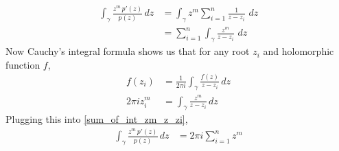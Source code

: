 \documentclass{homework}
\begin{document}
                                                                                      \begin{solution}
                                                                                      \begin{align}
                                                                                      \int_\gamma \frac{z^m \, p'(z)}{p(z)} \, dz &= \int_\gamma z^m\sum_{i=1}^n \frac{1}{z-z_i} \, \, dz\\
                                                                                      \label{sum_of_int_zm_z_zi}
                                                                                      &= \sum_{i=1}^n \int_\gamma \frac{z^m}{z-z_i} \, \, dz
                                                                                      \end{align}
                                                                                      Now Cauchy's integral formula shows us that for any root $z_i$ and holomorphic function $f$,
                                                                                      \begin{align*}
                                                                                      f(z_i) &= \frac{1}{2\pi i}\int_\gamma \frac{f(z)}{z - z_i}\,dz\\
                                                                                      2\pi i z_i^m &= \int_\gamma \frac{z^m}{z - z_i}\,dz
                                                                                      \end{align*}
                                                                                      Plugging this into \ref{sum_of_int_zm_z_zi},
                                                                                      \begin{align*}
                                                                                      \int_\gamma \frac{z^m \, p'(z)}{p(z)} \, dz &= 2\pi i\sum_{i=1}^n z^m
                                                                                      \end{align*}
                                                                                      \end{solution}
\end{document}
